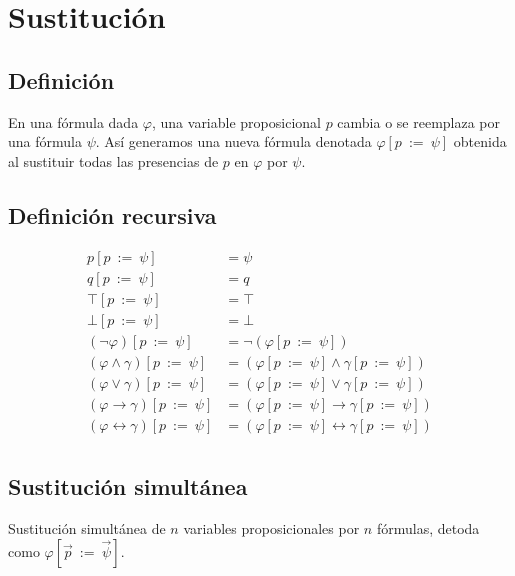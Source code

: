 \documentclass[a4paper]{article}
\begin{document}
\section{Sustitución}
\subsection{Definición}
\noindent
En una fórmula dada \(\varphi\), una variable proposicional \(p\) cambia o se reemplaza por una
fórmula \(\psi\). Así generamos una nueva fórmula denotada \(\varphi \left[p \ := \ \psi\right]\)
obtenida al sustituir todas las presencias de \(p\) en \(\varphi\) por \(\psi\).
\subsection{Definición recursiva}
\begin{align*}
    p\left[p \ := \ \psi \right] &= \psi \\
    q\left[p \ := \ \psi \right] &= q \\
    \top\left[p \ := \ \psi \right] &= \top \\
    \bot\left[p \ := \ \psi \right] &= \bot \\
    \left(\neg \varphi\right)\left[p \ := \ \psi \right] &= \neg \left(\varphi\left[p \ := \ \psi \right]\right) \\
    \left(\varphi \land \gamma \right)\left[p \ := \ \psi \right] &= \left(\varphi\left[p \ := \ \psi \right] \land \gamma\left[p \ := \ \psi \right]\right) \\
    \left(\varphi \lor \gamma \right)\left[p \ := \ \psi \right] &= \left(\varphi\left[p \ := \ \psi \right] \lor \gamma\left[p \ := \ \psi \right]\right) \\
    \left(\varphi \rightarrow \gamma \right)\left[p \ := \ \psi \right] &= \left(\varphi\left[p \ := \ \psi \right] \rightarrow \gamma\left[p \ := \ \psi \right]\right) \\
    \left(\varphi \leftrightarrow \gamma \right)\left[p \ := \ \psi \right] &= \left(\varphi\left[p \ := \ \psi \right] \leftrightarrow \gamma\left[p \ := \ \psi \right]\right) \\
\end{align*}
\subsection{Sustitución simultánea}
\noindent
Sustitución simultánea de \(n\) variables proposicionales por \(n\) fórmulas, detoda como 
\(\varphi\left[\vec{p} \ := \ \vec{\psi}\right]\).
\end{document}
